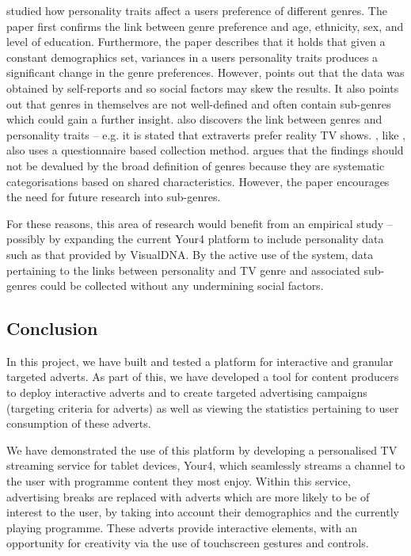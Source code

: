 	\citet{rentfrow2010listening} studied how personality traits affect a users preference of different genres. The paper first confirms the link between genre preference and age, ethnicity, sex, and level of education. Furthermore, the paper describes that it holds that given a constant demographics set, variances in a users personality traits produces a significant change in the genre preferences. However, \citeauthor{rentfrow2010listening} points out that the data was obtained by self-reports and so social factors may skew the results. It also points out that genres in themselves are not well-defined and often contain sub-genres which could gain a further insight. \citet{shim2007effects} also discovers the link between genres and personality traits -- e.g. it is stated that extraverts prefer reality TV shows. \citeauthor{shim2007effects}, like \citeauthor{rentfrow2010listening}, also uses a questionnaire based collection method. \citeauthor{shim2007effects} argues that the findings should not be devalued by the broad definition of genres because they are systematic categorisations based on shared characteristics. However, the paper encourages the need for future research into sub-genres.

	For these reasons, this area of research would benefit from an empirical study -- possibly by expanding the current Your4 platform to include personality data such as that provided by VisualDNA. By the active use of the system, data pertaining to the links between personality and TV genre and associated sub-genres could be collected without any undermining social factors.

\subsection{Conclusion}

% 
In this project, we have built and tested a platform for interactive and granular targeted adverts. As part of this, we have developed a tool for content producers to deploy interactive adverts and to create targeted advertising campaigns (targeting criteria for adverts) as well as viewing the statistics pertaining to user consumption of these adverts.

We have demonstrated the use of this platform by developing a personalised TV streaming service for tablet devices, Your4, which seamlessly streams a channel to the user with programme content they most enjoy. Within this service, advertising breaks are replaced with adverts which are more likely to be of interest to the user, by taking into account their demographics and the currently playing programme. These adverts provide interactive elements, with an opportunity for creativity via the use of touchscreen gestures and controls.

